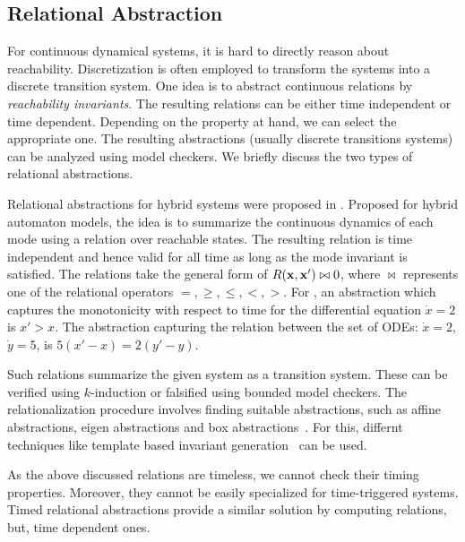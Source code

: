 
\subsection{Relational Abstraction}

For continuous dynamical systems, it is hard to directly reason about
reachability. Discretization is often employed to transform the
systems into a discrete transition system. One idea is to abstract
continuous relations by \textit{reachability invariants}. The
resulting relations can be either time independent or time dependent.
Depending on the property at hand, we can select the appropriate one.
The resulting abstractions (usually discrete transitions systems) can
be analyzed using model checkers. We briefly discuss the two types of
relational abstractions.


Relational abstractions for hybrid systems were proposed in
\cite{Sankaranarayanan+Tiwari/2011/Relational}. Proposed for hybrid
automaton models, the idea is to summarize the continuous dynamics of
each mode using a relation over reachable states. The resulting
relation is time independent and hence valid for all time as long as
the mode invariant is satisfied. The relations take the general form
of $R(\mathbf{x},\mathbf{x}') \bowtie 0$, where $\bowtie$ represents one of the
relational operators $=, \ge, \le, <, >$. For \eg, an abstraction
which captures the monotonicity with respect to time for the
differential equation $\dot{x} = 2$ is $x' > x$.  The abstraction
capturing the relation between the set of ODEs: $\dot{x} = 2$,
$\dot{y} = 5$, is $5(x' - x) = 2(y' - y)$.

Such relations summarize the given system as a transition system.
These can be verified using $k$-induction or falsified using bounded
model checkers. The relationalization procedure involves finding
suitable abstractions, such as affine abstractions, eigen abstractions
and box abstractions~\cite{Sankaranarayanan+Tiwari/2011/Relational}.
For this, differnt techniques like template based invariant
generation~\cite{Gulwani+Tiwari/2008/Constraint,
Colon+Sankaranarayanan+Sipma/03/Linear} can be used.


As the above discussed relations are timeless, we cannot check their
timing properties.  Moreover, they cannot be easily specialized for
time-triggered systems. Timed relational abstractions provide a
similar solution by computing relations, but, time dependent ones.

